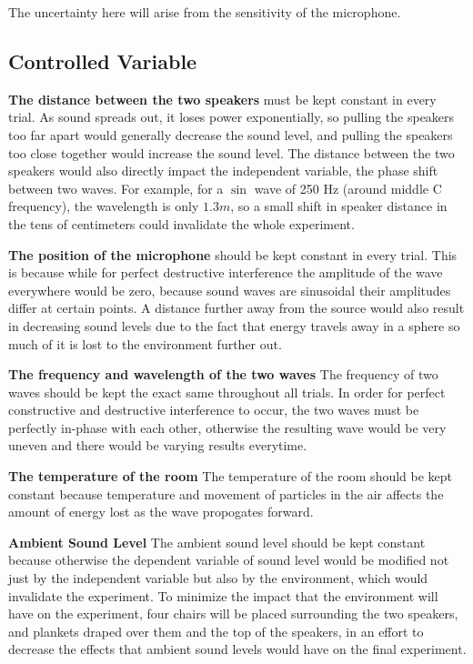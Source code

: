 \documentclass[index]{subfiles}
\begin{document}
The uncertainty here will arise from the sensitivity of the microphone.

\subsection{Controlled Variable}

\textbf{The distance between the two speakers} must be kept constant in every trial. As sound spreads out, it loses power exponentially, so pulling the speakers too far apart would generally decrease the sound level, and pulling the speakers too close together would increase the sound level. The distance between the two speakers would also directly impact the independent variable, the phase shift between two waves. For example, for a \(\sin\) wave of 250 Hz (around middle C frequency), the wavelength is only \(1.3m\), so a small shift in speaker distance in the tens of centimeters could invalidate the whole experiment.

\textbf{The position of the microphone} should be kept constant in every trial. This is because while for perfect destructive interference the amplitude of the wave everywhere would be zero, because sound waves are sinusoidal their amplitudes differ at certain points. A distance further away from the source would also result in decreasing sound levels due to the fact that energy travels away in a sphere so much of it is lost to the environment further out.

\textbf{The frequency and wavelength of the two waves} The frequency of two waves should be kept the exact same throughout all trials. In order for perfect constructive and destructive interference to occur, the two waves must be perfectly in-phase with each other, otherwise the resulting wave would be very uneven and there would be varying results everytime.

\textbf{The temperature of the room} The temperature of the room should be kept constant because temperature and movement of particles in the air affects the amount of energy lost as the wave propogates forward.

\textbf{Ambient Sound Level} The ambient sound level should be kept constant because otherwise the dependent variable of sound level would be modified not just by the independent variable but also by the environment, which would invalidate the experiment. To minimize the impact that the environment will have on the experiment, four chairs will be placed surrounding the two speakers, and plankets draped over them and the top of the speakers, in an effort to decrease the effects that ambient sound levels would have on the final experiment.
\end{document}
